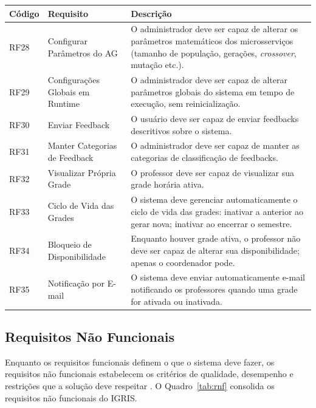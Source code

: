 \newpage
\begin{longtable}{|C{1.8cm}|L{4.5cm}|L{7.1cm}|}
\hline
\textbf{Código} & \textbf{Requisito} & \textbf{Descrição} \\
\hline
\endhead
RF28 & Configurar Parâmetros do AG & O administrador deve ser capaz de alterar os parâmetros matemáticos dos microsserviços (tamanho de população, gerações, \textit{crossover}, mutação etc.). \\
\hline
RF29 & Configurações Globais em Runtime & O administrador deve ser capaz de alterar parâmetros globais do sistema em tempo de execução, sem reinicialização. \\
\hline
RF30 & Enviar Feedback & O usuário deve ser capaz de enviar feedbacks descritivos sobre o sistema. \\
\hline
RF31 & Manter Categorias de Feedback & O administrador deve ser capaz de manter as categorias de classificação de feedbacks. \\
\hline
RF32 & Visualizar Própria Grade & O professor deve ser capaz de visualizar sua grade horária ativa. \\
\hline
RF33 & Ciclo de Vida das Grades & O sistema deve gerenciar automaticamente o ciclo de vida das grades: inativar a anterior ao gerar nova; inativar ao encerrar o semestre. \\
\hline
RF34 & Bloqueio de Disponibilidade & Enquanto houver grade ativa, o professor não deve ser capaz de alterar sua disponibilidade; apenas o coordenador pode. \\
\hline
RF35 & Notificação por E-mail & O sistema deve enviar automaticamente e-mail notificando os professores quando uma grade for ativada ou inativada. \\
\hline
\end{longtable}

\fonteautores

\subsection{Requisitos Não Funcionais}
\label{subsec:3.3.2}

Enquanto os requisitos funcionais definem o que o sistema deve fazer, os requisitos não funcionais estabelecem os critérios de qualidade, desempenho e restrições que a solução deve respeitar \cite[p.~86]{sommerville2016}. O Quadro~\ref{tab:rnf} consolida os requisitos não funcionais do IGRIS.


